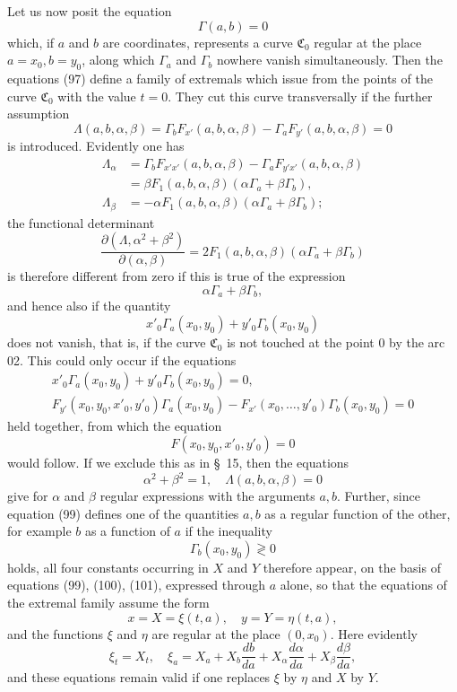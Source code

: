 \documentclass[11pt,a4paper,leqno]{article}
\begin{document}
Let us now posit the equation
\begin{equation}\tag{99}
\Gamma(a,b)=0
\end{equation}
which, if $a$ and $b$ are coordinates, represents a curve $\mathfrak C_0$ regular at the place $a=x_0,b=y_0$, along which $\Gamma_a$ and $\Gamma_b$ nowhere vanish simultaneously. Then the equations (97) define a family of extremals which issue from the points of the curve $\mathfrak C_0$ with the value $t=0$. They cut this curve transversally if the further assumption
\begin{equation}\tag{100}
\Lambda(a,b,\alpha,\beta)=\Gamma_bF_{x'}(a,b,\alpha,\beta)-\Gamma_aF_{y'}(a,b,\alpha,\beta)=0
\end{equation}
is introduced. Evidently one has
\[
\begin{aligned}
\Lambda_{\alpha}
&=\Gamma_bF_{x'x'}(a,b,\alpha,\beta)-\Gamma_aF_{y'x'}(a,b,\alpha,\beta)\\
&=\beta F_1(a,b,\alpha,\beta)(\alpha\Gamma_a+
\beta\Gamma_b),\\
\Lambda_{\beta}
&=-\alpha F_1(a,b,\alpha,\beta)(\alpha\Gamma_a+
\beta\Gamma_b);
\end{aligned}
\]
the functional determinant
\[
\frac{\partial(\Lambda,\alpha^2+\beta^2)}{\partial(\alpha,\beta)}
=2F_1(a,b,\alpha,\beta)(\alpha\Gamma_a+
\beta\Gamma_b)
\]
is therefore different from zero if this is true of the expression
\[
\alpha\Gamma_a+\beta\Gamma_b,
\]
and hence also if the quantity
\[
x'_0\Gamma_a(x_0,y_0)+y'_0\Gamma_b(x_0,y_0)
\]
does not vanish, that is, if the curve $\mathfrak C_0$ is not touched at the point 0 by the arc 02. This could only occur if the equations
\[
\begin{gathered}
x'_0\Gamma_a(x_0,y_0)+y'_0\Gamma_b(x_0,y_0)=0,\\
F_{y'}(x_0,y_0,x'_0,y'_0)\Gamma_a(x_0,y_0)
-F_{x'}(x_0,\ldots,y'_0)\Gamma_b(x_0,y_0)=0
\end{gathered}
\]
held together, from which the equation
\[
F(x_0,y_0,x'_0,y'_0)=0
\]
would follow. If we exclude this as in \S~15, then the equations
\begin{equation}\tag{101}
\alpha^2+\beta^2=1,
\quad
\Lambda(a,b,\alpha,\beta)=0
\end{equation}
give for $\alpha$ and $\beta$ regular expressions with the arguments $a,b$. Further, since equation (99) defines one of the quantities $a,b$ as a regular function of the other, for example $b$ as a function of $a$ if the inequality
\[
\Gamma_b(x_0,y_0)\gtrless0
\]
holds, all four constants occurring in $X$ and $Y$ therefore appear, on the basis of equations (99), (100), (101), expressed through $a$ alone, so that the equations of the extremal family assume the form
\[
x=X=\xi(t,a),
\quad
y=Y=\eta(t,a),
\]
and the functions $\xi$ and $\eta$ are regular at the place $(0,x_0)$. Here evidently
\[
\xi_t=X_t,
\quad
\xi_a=X_a+X_b\frac{db}{da}+X_{\alpha}\frac{d\alpha}{da}+X_{\beta}\frac{d\beta}{da},
\]
and these equations remain valid if one replaces $\xi$ by $\eta$ and $X$ by $Y$.
\end{document}
